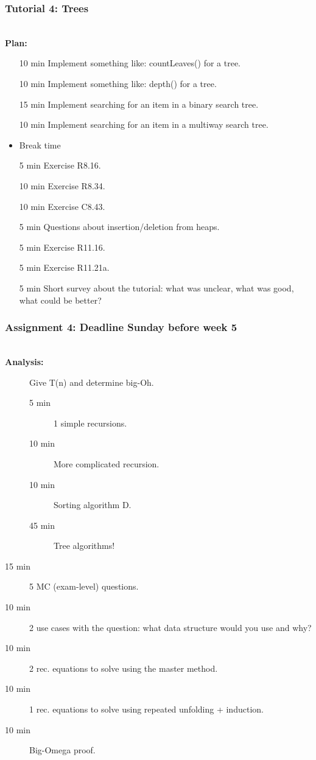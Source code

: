 \newpage
\subsubsection{Tutorial 4: Trees}
\label{ssub:tutorial_4}

\hfill\\
\textbf{Plan:}\\
\begin{itemize}
	\item[10 min] Implement something like: countLeaves() for a tree.
	\item[10 min] Implement something like: depth() for a tree.
	\item[15 min] Implement searching for an item in a binary search tree.
	\item[10 min] Implement searching for an item in a multiway search tree.
	\item Break time
	\item[5 min] Exercise R8.16.
	\item[10 min] Exercise R8.34.
	\item[10 min] Exercise C8.43.
	\item[5 min] Questions about insertion/deletion from heaps.
	\item[5 min] Exercise R11.16.
	\item[5 min] Exercise R11.21a.
	\item[5 min] Short survey about the tutorial: what was unclear, what was good, what could be better?
\end{itemize}


\newpage
\subsubsection{Assignment 4: Deadline Sunday before week 5}
\label{ssub:assignment_4}

\hfill\\
\textbf{Analysis:}\\
\begin{description}
	\item[] Give T(n) and determine big-Oh. 
		\begin{description}
			\item[5 min] 1 simple recursions.
			\item[10 min] More complicated recursion.
			\item[10 min] Sorting algorithm D.
			\item[45 min] Tree algorithms!
		\end{description}
	\item[15 min] 5 MC (exam-level) questions.
	\item[10 min] 2 use cases with the question: what data structure would you use and why?
	\item[10 min] 2 rec. equations to solve using the master method.
	\item[10 min] 1 rec. equations to solve using repeated unfolding + induction.
	\item[10 min] Big-Omega proof.
\end{description}

